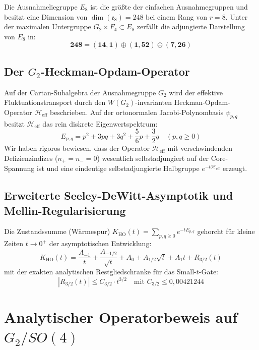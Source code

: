 \documentclass[11pt,a4paper]{article}
\begin{document}
	Die Ausnahmeliegruppe $E_8$ ist die größte der einfachen Ausnahmegruppen und besitzt eine Dimension von $\dim(\mathfrak{e}_8) = 248$ bei einem Rang von $r = 8$. Unter der maximalen Untergruppe $G_2 \times F_4 \subset E_8$ zerfällt die adjungierte Darstellung von $E_8$ in:
	\begin{equation}
		\mathbf{248} = (\mathbf{14}, \mathbf{1}) \oplus (\mathbf{1}, \mathbf{52}) \oplus (\mathbf{7}, \mathbf{26})
	\end{equation}
	
	\subsection{Der $G_2$-Heckman-Opdam-Operator}
	Auf der Cartan-Subalgebra der Ausnahmegruppe $G_2$ wird der effektive Fluktuationstransport durch den $W(G_2)$-invarianten Heckman-Opdam-Operator $\mathcal{H}_{\text{eff}}$ beschrieben. Auf der ortonormalen Jacobi-Polynombasis $\psi_{p,q}$ besitzt $\mathcal{H}_{\text{eff}}$ das rein diskrete Eigenwertspektrum:
	\begin{equation}
		E_{p,q} = p^2 + 3pq + 3q^2 + \frac{5}{6}p + \frac{3}{2}q \quad (p, q \ge 0)
	\end{equation}
	Wir haben rigoros bewiesen, dass der Operator $\mathcal{H}_{\text{eff}}$ mit verschwindenden Defizienzindizes ($n_+ = n_- = 0$) wesentlich selbstadjungiert auf der Core-Spannung ist und eine eindeutige selbstadjungierte Halbgruppe $e^{-t \mathcal{H}_{\text{eff}}}$ erzeugt.
	
	\subsection{Erweiterte Seeley-DeWitt-Asymptotik und Mellin-Regularisierung}
	Die Zustandssumme (Wärmespur) $K_{\text{HO}}(t) = \sum_{p,q \ge 0} e^{-t E_{p,q}}$ gehorcht für kleine Zeiten $t \to 0^+$ der asymptotischen Entwicklung:
	\begin{equation}
		K_{\text{HO}}(t) = \frac{A_{-1}}{t} + \frac{A_{-1/2}}{\sqrt{t}} + A_0 + A_{1/2}\sqrt{t} + A_1 t + R_{3/2}(t)
	\end{equation}
	mit der exakten analytischen Restgliedschranke für das Small-$t$-Gate:
	\begin{equation}
		|R_{3/2}(t)| \le C_{3/2} \cdot t^{3/2} \quad \text{mit } C_{3/2} \le 0{,}00421244
	\end{equation}
	
	\section{Analytischer Operatorbeweis auf $G_2/SO(4)$}
	
\end{document}
